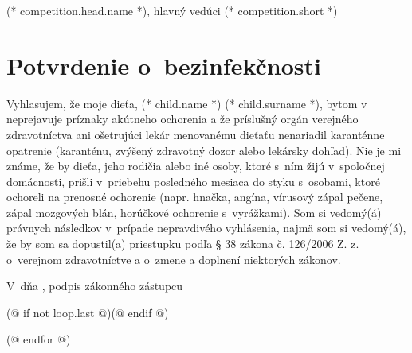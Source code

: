 \documentclass[12pt, twoside]{article}
\begin{document}
        \hfill (* competition.head.name *), hlavný vedúci (* competition.short *)
    
    \cutHere

    \section{Potvrdenie o~bezinfekčnosti}
        Vyhlasujem, že moje dieťa, (* child.name *) (* child.surname *), bytom v~\makebox[30mm]{\dotfill} neprejavuje príznaky akútneho ochorenia a že
        príslušný orgán verejného zdravotníctva ani ošetrujúci lekár menovanému dieťaťu nenariadil
        karanténne opatrenie (karanténu, zvýšený zdravotný dozor alebo lekársky dohľad). Nie je mi známe, že
        by dieťa, jeho rodičia alebo iné osoby, ktoré s~ním žijú v~spoločnej domácnosti, prišli v~priebehu
        posledného mesiaca do styku s~osobami, ktoré ochoreli na prenosné ochorenie (napr. hnačka, angína,
        vírusový zápal pečene, zápal mozgových blán, horúčkové ochorenie s~vyrážkami). Som si
        vedomý(á) právnych následkov v~prípade nepravdivého vyhlásenia, najmä som si vedomý(á), že by som sa
        dopustil(a) priestupku podľa § 38 zákona č. 126/2006 Z. z. o~verejnom zdravotníctve a o~zmene a
        doplnení niektorých zákonov.
        \vspace{5mm}

        V~\dotfill dňa \dotfill, \hfill podpis zákonného zástupcu \dotfill
        \vspace*{5mm}

    \cutHere
    (@ if not loop.last @)\newpage(@ endif @)

    (@ endfor @)
\end{document}
